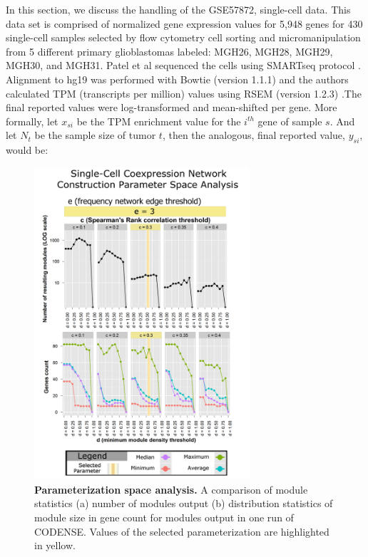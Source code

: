 \documentclass[10pt,letterpaper]{article}
\begin{document}
In this section, we discuss the handling of the GSE57872, single-cell data. This data set is comprised of normalized gene expression values for 5,948 genes for 430 single-cell samples selected by flow cytometry cell sorting and micromanipulation from 5 different primary glioblastomas labeled: MGH26, MGH28, MGH29, MGH30, and MGH31. Patel et al sequenced the cells using SMARTseq protocol \cite{Ramskold2012}. Alignment to hg19 was performed with Bowtie (version 1.1.1) \cite{Langmead2009} and the authors calculated TPM (transcripts per million) values using RSEM (version 1.2.3) \cite{Li2011}.The final reported values were log-transformed and mean-shifted per gene. More formally, let $x_{si}$ be the TPM enrichment value for the $i^{th}$ gene of sample $s$. And let $N_{t}$ be the sample size of tumor $t$, then the analogous, final reported value, $y_{si}$, would be: %

\begin{figure}[h]
\centering
\includegraphics[width=80mm]{Figures/ParameterSpaceE=3}
\caption{\textbf{Parameterization space analysis.} A comparison of module statistics (a) number of modules output (b) distribution statistics of module size in gene count for modules output in one run of CODENSE. Values of the selected parameterization are highlighted in yellow.}
\label{Parameter Space Figure}
\end{figure}
\end{document}
